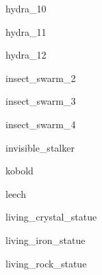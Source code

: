 \documentclass[letterpaper,serif]{module}
\begin{document}
\begin{newmonster}{hydra_10}\end{newmonster}

\begin{newmonster}{hydra_11}\end{newmonster}

\begin{newmonster}{hydra_12}\end{newmonster}


\begin{newmonster}{insect_swarm_2}\end{newmonster}

\begin{newmonster}{insect_swarm_3}\end{newmonster}

\begin{newmonster}{insect_swarm_4}\end{newmonster}

\begin{newmonster}{invisible_stalker}\end{newmonster}

\begin{newmonster}{kobold}\end{newmonster}

\begin{newmonster}{leech}\end{newmonster}


\begin{newmonster}{living_crystal_statue}\end{newmonster}

\begin{newmonster}{living_iron_statue}\end{newmonster}

\begin{newmonster}{living_rock_statue}\end{newmonster}

\end{document}

